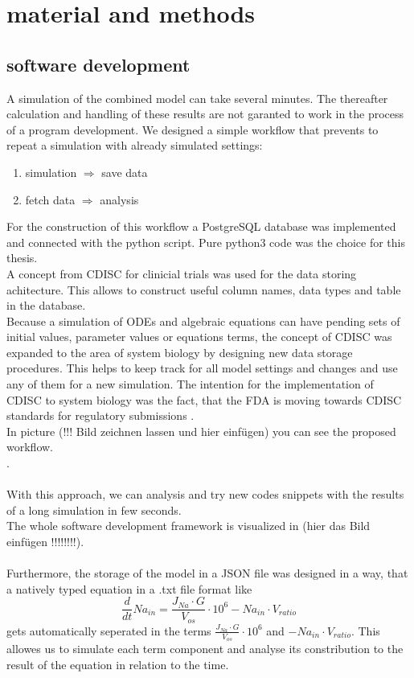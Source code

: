 
\section{material and methods}
\subsection{software development}
A simulation of the combined model can take several minutes. The thereafter calculation and handling of these results are not garanted to work in the process of a program development. We designed a simple workflow that prevents to repeat a simulation with already simulated settings:
\begin{enumerate}
	\item simulation $\Rightarrow$ save data
	\item fetch data $\Rightarrow$ analysis
\end{enumerate}
For the construction of this workflow a PostgreSQL database was implemented and connected with the python script. Pure python3 code was the choice for this thesis.  \\
A concept from CDISC for clinicial trials was used for the data storing achitecture. This allows to construct useful column names, data types and table in the database.\\ 
Because a simulation of ODEs and algebraic equations can have pending sets of initial values, parameter values or equations terms, the concept of CDISC was expanded to the area of system biology by designing new data storage procedures. This helps to keep track for all model settings and changes and use any of them for a new simulation. The intention for the  implementation of CDISC to system biology was the fact, that the FDA is moving towards CDISC standards for regulatory submissions \cite{SDTMStandard}. \\
In picture (!!! Bild zeichnen lassen und hier einfügen) you can see  the proposed workflow. \\ .\\\\
With this approach, we can analysis and try new codes snippets with the results of a long simulation in few seconds. \\
The whole software development framework is visualized in (hier das Bild einfügen !!!!!!!!). \\\\
Furthermore, the storage of the model in a JSON file was designed in a way, that a natively typed equation in a .txt file format like 
\begin{equation*}
	\frac{d}{dt} Na_{in} = \frac{J_{Na} \cdot G}{V_{os}} \cdot 10^6 - Na_{in} \cdot V_{ratio} 
\end{equation*}
gets automatically seperated in the terms $\frac{J_{Na} \cdot G}{V_{os}} \cdot 10^6$ and $- Na_{in} \cdot V_{ratio}$. This allowes us to simulate each term component and analyse its constribution to the result of the equation in relation to the time.\\
\newpage